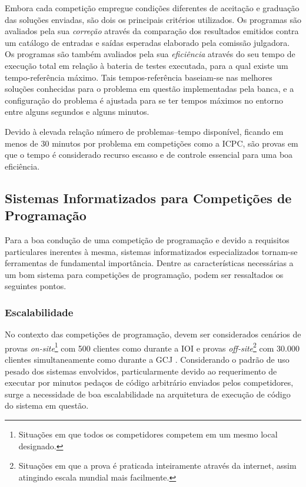 \documentclass[ruledheader]{abnt}
\begin{document}
Embora cada competição empregue condições diferentes de aceitação e graduação das soluções enviadas, são dois os principais critérios utilizados. Os programas são avaliados pela sua \emph{correção} através da comparação dos resultados emitidos contra um catálogo de entradas e saídas esperadas elaborado pela comissão julgadora. Os programas são também avaliados pela sua \emph{eficiência} através do seu tempo de execução total em relação à bateria de testes executada, para a qual existe um tempo-referência máximo. Tais tempos-referência baseiam-se nas melhores soluções conhecidas para o problema em questão implementadas pela banca, e a configuração do problema é ajustada para se ter tempos máximos no entorno entre alguns segundos e alguns minutos.

Devido à elevada relação número de problemas--tempo disponível, ficando em menos de 30 minutos por problema em competições como a ICPC, são provas em que o tempo é considerado recurso escasso e de controle essencial para uma boa eficiência.

\subsection{Sistemas Informatizados para Competições de Programação}

Para a boa condução de uma competição de programação e devido a requisitos particulares inerentes à mesma, sistemas informatizados especializados tornam-se ferramentas de fundamental importância. Dentre as características necessárias a um bom sistema para competições de programação, podem ser ressaltados os seguintes pontos.

\subsubsection{Escalabilidade}

No contexto das competições de programação, devem ser considerados cenários de provas \emph{on-site}\footnote{Situações em que todos os competidores competem em um mesmo local designado.} com 500 clientes como durante a IOI \cite{ioi-nl1-2007} e provas \emph{off-site}\footnote{Situações em que a prova é praticada inteiramente através da internet, assim atingindo escala mundial mais facilmente.} com 30.000 clientes simultaneamente como durante a GCJ \cite{googlecodejamhistory}.  Considerando o padrão de uso pesado dos sistemas envolvidos, particularmente devido ao requerimento de executar por minutos pedaços de código arbitrário enviados pelos competidores, surge a necessidade de boa escalabilidade na arquitetura de execução de código do sistema em questão.
\end{document}
